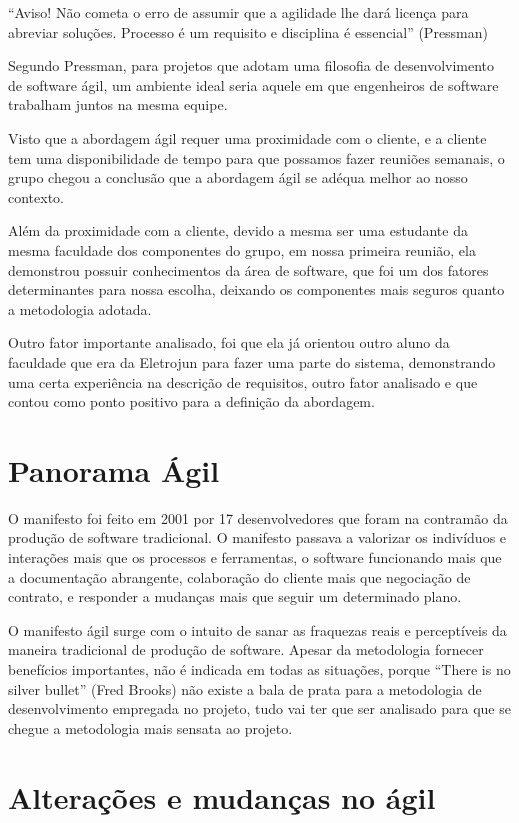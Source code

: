 “Aviso! Não cometa o erro de assumir que a agilidade lhe dará licença para abreviar soluções. Processo é um requisito e disciplina é essencial” (Pressman)

Segundo Pressman, para projetos que adotam uma filosofia de desenvolvimento de software ágil, um ambiente ideal seria aquele em que engenheiros de software trabalham juntos na mesma equipe.

Visto que a abordagem ágil requer uma proximidade com o cliente, e a cliente tem uma disponibilidade de tempo para que possamos fazer reuniões semanais, o grupo chegou a conclusão que a abordagem ágil se adéqua melhor ao nosso contexto.

Além da proximidade com a cliente, devido a mesma ser uma estudante da mesma faculdade dos componentes do grupo, em nossa primeira reunião, ela demonstrou possuir conhecimentos da área de software, que foi um dos fatores determinantes para nossa escolha, deixando os componentes mais seguros quanto a metodologia adotada.

Outro fator importante analisado, foi que ela já orientou outro aluno da faculdade que era da Eletrojun para fazer uma parte do sistema, demonstrando uma certa experiência na descrição de requisitos, outro fator analisado e que contou como ponto positivo para a definição da abordagem.

\section {Panorama Ágil}

O manifesto foi feito em 2001 por 17 desenvolvedores que foram na contramão da produção de software tradicional. O manifesto passava a valorizar os indivíduos e interações mais que os processos e ferramentas, o software funcionando mais que a documentação abrangente, colaboração do cliente mais que negociação de contrato, e responder a mudanças mais que seguir um determinado plano.

O manifesto ágil surge com o intuito de sanar as fraquezas  reais e perceptíveis da maneira tradicional de produção de software. Apesar da metodologia fornecer benefícios importantes, não é indicada em todas as situações, porque “There is no silver bullet” (Fred Brooks) não existe a bala de prata para a metodologia de desenvolvimento empregada no projeto, tudo vai ter que ser analisado para que se chegue a metodologia mais sensata ao projeto.

\section{Alterações e mudanças no ágil}

